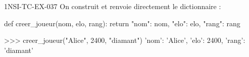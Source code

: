 \begin{corrige}{1NSI-TC-EX-037}
On construit et renvoie directement le dictionnaire :

\begin{python}
def creer_joueur(nom, elo, rang):
    return {"nom": nom, "elo": elo, "rang": rang}
\end{python}

\begin{console}
>>> creer_joueur("Alice", 2400, "diamant")
{'nom': 'Alice', 'elo': 2400, 'rang': 'diamant'}
\end{console}
\end{corrige}
